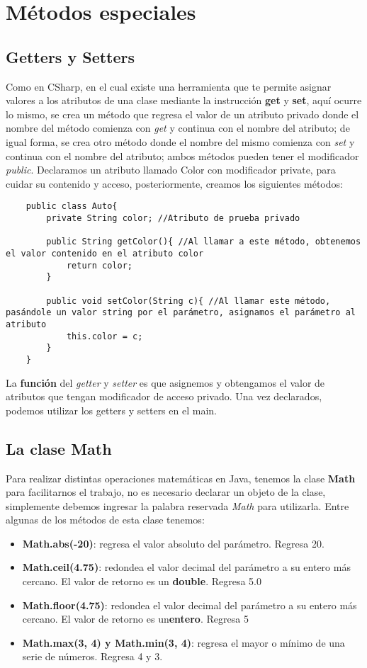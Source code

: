 \section{Métodos especiales}
\subsection{Getters y Setters}
Como en CSharp, en el cual existe una herramienta que te permite asignar valores a los atributos de una clase mediante la instrucción \textbf{get} y \textbf{set}, aquí ocurre lo mismo, se crea un método que regresa el valor de un atributo privado donde el nombre del método comienza con \textit{get} y continua con el nombre del atributo; de igual forma, se crea otro método donde el nombre del mismo comienza con \textit{set} y continua con el nombre del atributo; ambos métodos pueden tener el modificador \textit{public}. Declaramos un atributo llamado Color con modificador private, para cuidar su contenido y acceso, posteriormente, creamos los siguientes métodos:
\begin{lstlisting}
    public class Auto{
        private String color; //Atributo de prueba privado
        
        public String getColor(){ //Al llamar a este método, obtenemos el valor contenido en el atributo color
            return color;
        }
        
        public void setColor(String c){ //Al llamar este método, pasándole un valor string por el parámetro, asignamos el parámetro al atributo
            this.color = c;
        }
    }
\end{lstlisting}
La \textbf{función} del \textit{getter} y \textit{setter} es que asignemos y obtengamos el valor de atributos que tengan modificador de acceso privado. Una vez declarados, podemos utilizar los getters y setters en el main.

\subsection{La clase Math}
Para realizar distintas operaciones matemáticas en Java, tenemos la clase \textbf{Math} para facilitarnos el trabajo, no es necesario declarar un objeto de la clase, simplemente debemos ingresar la palabra reservada \textit{Math} para utilizarla. Entre algunas de los métodos de esta clase tenemos:
\begin{itemize}
    \item \textbf{Math.abs(-20)}: regresa el valor absoluto del parámetro. Regresa 20.
    \item \textbf{Math.ceil(4.75)}: redondea el valor decimal del parámetro a su entero más cercano. El valor de retorno es un \textbf{double}. Regresa 5.0
    \item \textbf{Math.floor(4.75)}: redondea el valor decimal del parámetro a su entero más cercano. El valor de retorno es un\textbf{entero}. Regresa 5
    \item \textbf{Math.max(3, 4) y Math.min(3, 4)}: regresa el mayor o mínimo de una serie de números. Regresa 4 y 3.
\end{itemize}

